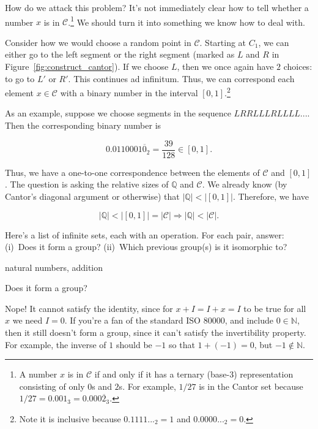 \documentclass[../key.tex]{subfiles}
\begin{document}
\noindent How do we attack this problem? It's not immediately clear how to tell whether a  number $x$ is in $\mathcal{C}$.\footnote{A number $x$ is in $\mathcal{C}$ if and only if it has a ternary (base-$3$) representation consisting of only $0$s and $2$s. For example, $1/27$ is in the Cantor set because $1/27 = 0.001_3 = 0.000\overline{2}_3$.} We should turn it into something we know how to deal with.

Consider how we would choose a random point in $\mathcal{C}$. Starting at $C_1$, we can either go to the left segment or the right segment (marked as $L$ and $R$ in Figure~\ref{fig:construct_cantor}). If we choose $L$, then we once again have $2$ choices: to go to $L'$ or $R'$. This continues ad infinitum. Thus, we can correspond each element $x\in \mathcal{C}$ with a binary number in the interval $[0,1]$.\footnote{Note it is inclusive because $0.1111..._2=1$ and $0.0000..._2=0$.}

As an example, suppose we choose segments in the sequence $LRRLLLRLLLL...$. Then the corresponding binary number is

$$0.0110001\overline{0}_2=\frac{39}{128}\in [0,1].$$

\noindent Thus, we have a one-to-one correspondence between the elements of $\mathcal{C}$ and $[0,1]$. The question is asking the relative sizes of $\mathbb{Q}$ and $\mathcal{C}$. We already know (by Cantor's diagonal argument or otherwise) that $|\mathbb{Q}| < |[0,1]|$. Therefore, we have

$$|\mathbb{Q}| < |[0,1]| = |\mathcal{C}| \Longrightarrow |\mathbb{Q}| < |\mathcal{C}|.$$

\begin{outer_problem}
\item Here’s a list of infinite sets, each with an operation. For each pair, answer: (i)~Does it form a group? (ii)~Which previous group(s) is it isomorphic to?
\end{outer_problem}

\begin{inner_problem}[start=1]
\item natural numbers, addition
\end{inner_problem}

\begin{iinner_problem}[start=1]
\item Does it form a group?
\end{iinner_problem}

\noindent Nope! It cannot satisfy the identity, since for $x+I=I+x=I$ to be true for all $x$ we need $I=0$. If you're a fan of the standard ISO 80000, and include $0\in\mathbb{N}$, then it still doesn't form a group, since it can't satisfy the invertibility property. For example, the inverse of $1$ should be $-1$ so that $1+(-1)=0$, but $-1 \not\in \mathbb{N}$.
\end{document}

